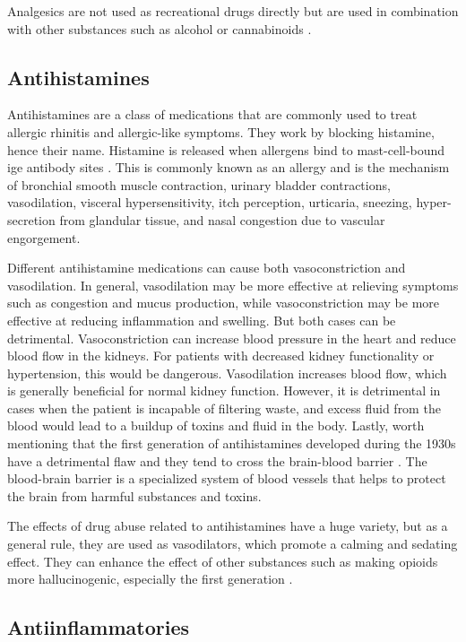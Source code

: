 Analgesics are not used as recreational drugs directly but are used in combination with other substances such as alcohol or cannabinoids \cite{otcAbuse2020}.

\subsection{Antihistamines}

Antihistamines are a class of medications that are commonly used to treat allergic rhinitis and allergic-like symptoms. They work by blocking histamine, hence their name. Histamine is released when allergens bind to mast-cell-bound \gls{ige} antibody sites \cite{Vardanyan2016}. This is commonly known as an allergy and is the mechanism of bronchial smooth muscle contraction, urinary bladder contractions, vasodilation, visceral hypersensitivity, itch perception, urticaria, sneezing, hyper-secretion from glandular tissue, and  nasal congestion due to vascular engorgement.

Different antihistamine medications can cause both vasoconstriction and vasodilation. In general, vasodilation may be more effective at relieving symptoms such as congestion and mucus production, while vasoconstriction may be more effective at reducing inflammation and swelling. But both cases can be detrimental. Vasoconstriction can increase blood pressure in the heart and reduce blood flow in the kidneys. For patients with decreased kidney functionality or hypertension, this would be dangerous. Vasodilation increases blood flow, which is generally beneficial for normal kidney function. However, it is detrimental in cases when the patient is incapable of filtering waste, and excess fluid from the blood would lead to a buildup of toxins and fluid in the body. Lastly, worth mentioning that the first generation of antihistamines developed during the 1930s have a detrimental flaw and they tend to cross the brain-blood barrier \cite{Walsh2005}. The blood-brain barrier is a specialized system of blood vessels that helps to protect the brain from harmful substances and toxins.

The effects of drug abuse related to antihistamines have a huge variety, but as a general rule, they are used as vasodilators, which promote a calming and sedating effect. They can enhance the effect of other substances such as making opioids more hallucinogenic, especially the first generation \cite{otcAbuse2020}.

\subsection{Antiinflammatories}


